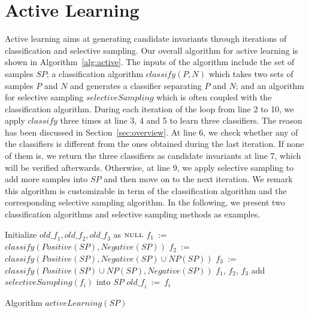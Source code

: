 
\section{Active Learning} %
\label{sec:learning}
Active learning aims at generating candidate invariants through iterations of classification and selective sampling. Our overall algorithm for active learning is shown in Algorithm~\ref{alg:active}. The inputs of the algorithm include the set of samples $\mathit{SP}$; a classification algorithm $\mathit{classify}(P,N)$ which takes two sets of samples $P$ and $N$ and generates a classifier separating $P$ and $N$; and an algorithm for selective sampling $\mathit{selectiveSampling}$ which is often coupled with the classification algorithm. During each iteration of the loop from line 2 to 10, we apply $\mathit{classify}$ three times at line 3, 4 and 5 to learn three classifiers. The reason has been discussed in Section~\ref{sec:overview}. At line 6, we check whether any of the classifiers is different from the ones obtained during the last iteration. If none of them is, we return the three classifiers as candidate invariants at line 7, which will be verified afterwards. Otherwise, at line 9, we apply selective sampling to add more samples into $\mathit{SP}$ and then move on to the next iteration. We remark this algorithm is customizable in term of the classification algorithm and the corresponding selective sampling algorithm. In the following, we present two classification algorithms and selective sampling methods as examples.

\begin{algorithm}[t]
\SetAlgoVlined
\Indm
\Indp
Initialize $\mathit{old\_f_1}, \mathit{old\_f_2}, \mathit{old\_f_3}$ as $\textsc{null}$\;
 {
    $f_1$\ := \ $\mathit{classify}(\mathit{Positive}(\mathit{SP}), \mathit{Negative}(\mathit{SP}))$\;
    $f_2$\ := \ $\mathit{classify}(\mathit{Positive}(\mathit{SP}), \mathit{Negative}(\mathit{SP}) \cup \mathit{NP}(\mathit{SP}))$\;
    $f_3$\ := \ $\mathit{classify}(\mathit{Positive}(\mathit{SP}) \cup \mathit{NP}(\mathit{SP}), \mathit{Negative}(\mathit{SP}))$\;
     {
        \Return $f_1$, $f_2$, $f_3$\;
    }
     {
        add $\mathit{selectiveSampling}(f_i)$ into $\mathit{SP}$\;
        $\mathit{old\_f_i}\ := \ f_i$\;
    }
}
\caption{Algorithm $\mathit{activeLearning}(\mathit{SP})$}
\label{alg:active}
\end{algorithm}

